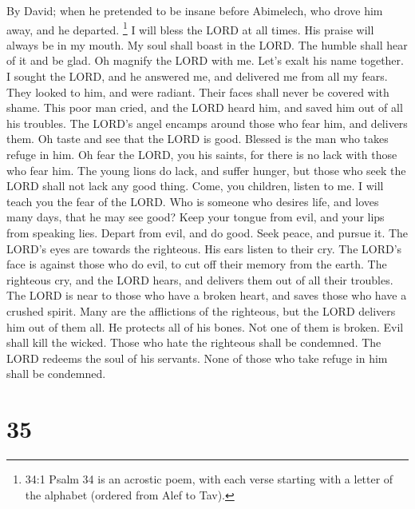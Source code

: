 By David; when he pretended to be insane before Abimelech, who drove him
away, and he departed.  \footnote{34:1 Psalm 34 is an
  acrostic poem, with each verse starting with a letter of the alphabet
  (ordered from Alef to Tav).} I will bless the LORD at all times. His
praise will always be in my mouth.  My soul shall boast in
the LORD. The humble shall hear of it and be glad.  Oh
magnify the LORD with me. Let's exalt his name together.  I
sought the LORD, and he answered me, and delivered me from all my fears.
 They looked to him, and were radiant. Their faces shall
never be covered with shame.  This poor man cried, and the
LORD heard him, and saved him out of all his troubles.  The
LORD's angel encamps around those who fear him, and delivers them.
 Oh taste and see that the LORD is good. Blessed is the man
who takes refuge in him.  Oh fear the LORD, you his saints,
for there is no lack with those who fear him.  The young
lions do lack, and suffer hunger, but those who seek the LORD shall not
lack any good thing.  Come, you children, listen to me. I
will teach you the fear of the LORD.  Who is someone who
desires life, and loves many days, that he may see good? 
Keep your tongue from evil, and your lips from speaking lies.
 Depart from evil, and do good. Seek peace, and pursue it.
 The LORD's eyes are towards the righteous. His ears listen
to their cry.  The LORD's face is against those who do
evil, to cut off their memory from the earth.  The
righteous cry, and the LORD hears, and delivers them out of all their
troubles.  The LORD is near to those who have a broken
heart, and saves those who have a crushed spirit.  Many are
the afflictions of the righteous, but the LORD delivers him out of them
all.  He protects all of his bones. Not one of them is
broken.  Evil shall kill the wicked. Those who hate the
righteous shall be condemned.  The LORD redeems the soul of
his servants. None of those who take refuge in him shall be condemned.

\hypertarget{section-34}{%
\section{35}\label{section-34}}


